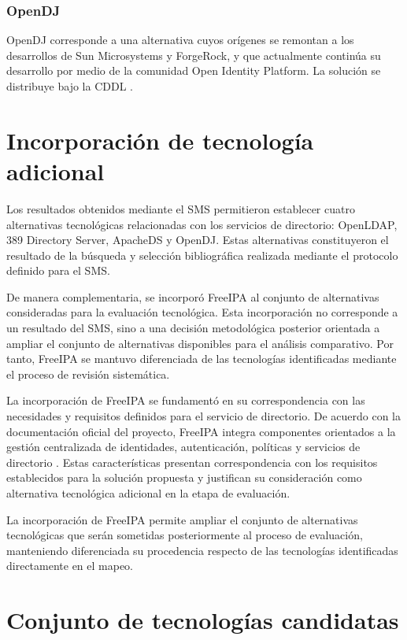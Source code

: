 \subsubsection{OpenDJ}

OpenDJ corresponde a una alternativa cuyos orígenes se remontan a los desarrollos de Sun Microsystems y ForgeRock, y que actualmente continúa su desarrollo por medio de la comunidad Open Identity Platform. La solución se distribuye bajo la \ac{CDDL} \citep{OpenDJ2026}.

\section{Incorporación de tecnología adicional}\label{sec:incorporacion-tecnologia-adicional}

Los resultados obtenidos mediante el \ac{SMS} permitieron establecer cuatro alternativas tecnológicas relacionadas con los servicios de directorio: OpenLDAP, 389 Directory Server, ApacheDS y OpenDJ. Estas alternativas constituyeron el resultado de la búsqueda y selección bibliográfica realizada mediante el protocolo definido para el SMS.

De manera complementaria, se incorporó FreeIPA al conjunto de alternativas consideradas para la evaluación tecnológica. Esta incorporación no corresponde a un resultado del SMS, sino a una decisión metodológica posterior orientada a ampliar el conjunto de alternativas disponibles para el análisis comparativo. Por tanto, FreeIPA se mantuvo diferenciada de las tecnologías identificadas mediante el proceso de revisión sistemática.

La incorporación de FreeIPA se fundamentó en su correspondencia con las necesidades y requisitos definidos para el servicio de directorio. De acuerdo con la documentación oficial del proyecto, FreeIPA integra componentes orientados a la gestión centralizada de identidades, autenticación, políticas y servicios de directorio \citep{FreeIPA2026}. Estas características presentan correspondencia con los requisitos establecidos para la solución propuesta y justifican su consideración como alternativa tecnológica adicional en la etapa de evaluación.

La incorporación de FreeIPA permite ampliar el conjunto de alternativas tecnológicas que serán sometidas posteriormente al proceso de evaluación, manteniendo diferenciada su procedencia respecto de las tecnologías identificadas directamente en el mapeo.

\section{Conjunto de tecnologías candidatas}\label{sec:conjunto-tecnologias-candidatas}

